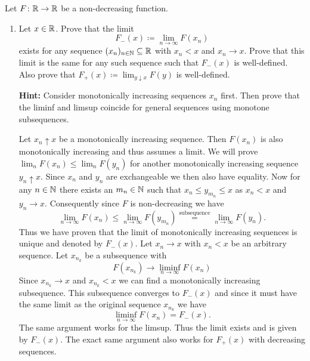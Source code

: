\begin{exercise}
    \label{ex: monotone functions have countably many discontinuities}
    Let \(F\colon \mathbb{R} \to \mathbb{R}\) be a non-decreasing function.
    \begin{enumerate}[label=(\alph*), noitemsep]
        \item Let \(x\in \mathbb{R}\). Prove that the limit
        \[
            F_-(x) \coloneq \lim_{n\to \infty} F(x_n)
        \]
        exists for any sequence \((x_n)_{n\in \mathbb{N}} \subseteq \mathbb{R}\) with \(x_n < x\)
        and \(x_n \to x\). Prove that this limit is the same for any such
        sequence such that \(F_-(x)\) is well-defined.
        Also prove that \(F_+(x) \coloneq \lim_{y\downarrow x} F(y)\) is
        well-defined.

        \textbf{Hint:} Consider monotonically increasing sequences \(x_n\) first.
        Then prove that the liminf and limsup coincide for general sequences
        using monotone subsequences.
        \begin{solution}
            Let \(x_n\uparrow x\) be a monotonically increasing sequence. Then
            \(F(x_n)\) is also monotonically increasing and thus assumes a limit.
            We will prove \(\lim_n F(x_n) \le \lim_n F(y_n)\)
            for another monotonically increasing sequence \(y_n\uparrow x\).
            Since \(x_n\) and \(y_n\) are exchangeable we then also have equality.
            Now for any \(n\in \mathbb{N}\) there exists an \(m_n\in \mathbb{N}\) such that
            \(x_n \le y_{m_n} \le x\) as \(x_n < x\) and \(y_n\to x\). Consequently
            since \(F\) is non-decreasing we have
            \[
                \lim_{n\to\infty} F(x_n) \le \lim_{n\to\infty}F(y_{m_n}) \overset{\text{subsequence}}= \lim_{n\to\infty}F(y_n).
            \]
            Thus we have proven that the limit of monotonically increasing
            sequences is unique and denoted by \(F_-(x)\). Let \(x_n \to x\) with \(x_n < x\) be an
            arbitrary sequence. Let \(x_{n_k}\) be a subsequence with
            \[
                F(x_{n_k}) \to \liminf_{n\to\infty} F(x_n)
            \]
            Since \(x_{n_k} \to x\) and \(x_{n_k} < x\) we can find a monotonically increasing subsequence.
            This subsequence converges to \(F_-(x)\) and since it must have the
            same limit as the original sequence \(x_{n_k}\) we have
            \[
                \liminf_{n\to\infty} F(x_n) = F_-(x).       
            \]
            The same argument works for the limsup. Thus the limit exists and is
            given by \(F_-(x)\). The exact same argument also works for
            \(F_+(x)\) with decreasing sequences.
        \end{solution}


\end{enumerate}
\end{exercise}
